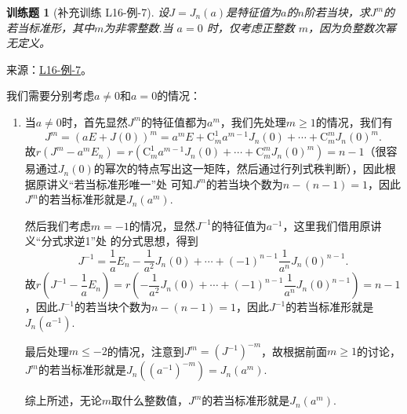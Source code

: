 \documentclass[12pt,fontset=fandol]{ctexart}
\newtheorem{exercise}{训练题}[section]
\begin{document}
\begin{exercise}[补充训练 L16-例-7]\label{prob:L16-例-7}
设$J=J_n(a)$是特征值为$a$的$n$阶若当块，求$J^m$的若当标准形，其中$m$为非零整数.当 $a=0$ 时，仅考虑正整数 $m$，因为负整数次幂无定义。
\end{exercise}
\noindent 来源：\href{https://github.com/yhwu-is/Linear-Algebra-Left-Undone/blob/new/%E8%AE%B2%E4%B9%89/%E4%B8%93%E9%A2%98/16%20%E8%8B%A5%E5%BD%93%E6%A0%87%E5%87%86%E5%BD%A2.tex}{L16-例-7}。
\begin{solve}
我们需要分别考虑$a\neq 0$和$a=0$的情况：
    \begin{enumerate}
        \item 当$a\neq 0$时，首先显然$J^m$的特征值都为$a^m$，我们先处理$m\geqslant 1$的情况，我们有
              \[J^m=(aE+J(0))^m=a^mE+\mathrm{C}_m^1a^{m-1}J_n(0)+\cdots+\mathrm{C}_m^mJ_n(0)^m.\]
              故$r(J^m-a^mE_n)=r(\mathrm{C}_m^1a^{m-1}J_n(0)+\cdots+\mathrm{C}_m^mJ_n(0)^m)=n-1$（很容易通过$J_n(0)$的幂次的特点写出这一矩阵，然后通过行列式秩判断），因此根据原讲义“若当标准形唯一”处 可知$J^m$的若当块个数为$n-(n-1)=1$，因此$J^m$的若当标准形就是$J_n(a^m)$.

              然后我们考虑$m=-1$的情况，显然$J^{-1}$的特征值为$a^{-1}$，这里我们借用原讲义“分式求逆1”处 的分式思想，得到
              \[J^{-1}=\dfrac{1}{a}E_n-\dfrac{1}{a^2}J_n(0)+\cdots+(-1)^{n-1}\dfrac{1}{a^n}J_n(0)^{n-1}.\]
              故$r(J^{-1}-\dfrac{1}{a}E_n)=r(-\dfrac{1}{a^2}J_n(0)+\cdots+(-1)^{n-1}\dfrac{1}{a^n}J_n(0)^{n-1})=n-1$，因此$J^{-1}$的若当块个数为$n-(n-1)=1$，因此$J^{-1}$的若当标准形就是$J_n(a^{-1})$.

              最后处理$m\leqslant -2$的情况，注意到$J^m=(J^{-1})^{-m}$，故根据前面$m\geqslant 1$的讨论，$J^m$的若当标准形就是$J_n((a^{-1})^{-m})=J_n(a^m)$.

              综上所述，无论$m$取什么整数值，$J^m$的若当标准形就是$J_n(a^m)$.


\end{enumerate}
\end{solve}
\end{document}

